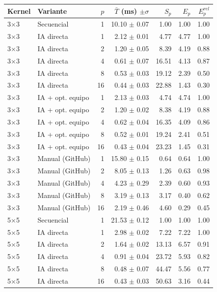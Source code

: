 \begin{tabular}{llrrrrr}
\toprule
Kernel & Variante & $p$ & $\bar{T}$ (ms) $\pm\sigma$ & $S_p$ & $E_p$ & $E^{rel}_p$ \\
\midrule
3$\times$3 & Secuencial & 1 & 10.10 $\pm$ 0.07 & 1.00 & 1.00 & 1.00 \\
3$\times$3 & IA directa & 1 & 2.12 $\pm$ 0.01 & 4.77 & 4.77 & 1.00 \\
3$\times$3 & IA directa & 2 & 1.20 $\pm$ 0.05 & 8.39 & 4.19 & 0.88 \\
3$\times$3 & IA directa & 4 & 0.61 $\pm$ 0.07 & 16.51 & 4.13 & 0.87 \\
3$\times$3 & IA directa & 8 & 0.53 $\pm$ 0.03 & 19.12 & 2.39 & 0.50 \\
3$\times$3 & IA directa & 16 & 0.44 $\pm$ 0.03 & 22.88 & 1.43 & 0.30 \\
3$\times$3 & IA + opt. equipo & 1 & 2.13 $\pm$ 0.03 & 4.74 & 4.74 & 1.00 \\
3$\times$3 & IA + opt. equipo & 2 & 1.20 $\pm$ 0.02 & 8.38 & 4.19 & 0.88 \\
3$\times$3 & IA + opt. equipo & 4 & 0.62 $\pm$ 0.04 & 16.35 & 4.09 & 0.86 \\
3$\times$3 & IA + opt. equipo & 8 & 0.52 $\pm$ 0.01 & 19.24 & 2.41 & 0.51 \\
3$\times$3 & IA + opt. equipo & 16 & 0.43 $\pm$ 0.04 & 23.23 & 1.45 & 0.31 \\
3$\times$3 & Manual (GitHub) & 1 & 15.80 $\pm$ 0.15 & 0.64 & 0.64 & 1.00 \\
3$\times$3 & Manual (GitHub) & 2 & 8.05 $\pm$ 0.13 & 1.26 & 0.63 & 0.98 \\
3$\times$3 & Manual (GitHub) & 4 & 4.23 $\pm$ 0.29 & 2.39 & 0.60 & 0.93 \\
3$\times$3 & Manual (GitHub) & 8 & 3.19 $\pm$ 0.13 & 3.17 & 0.40 & 0.62 \\
3$\times$3 & Manual (GitHub) & 16 & 2.19 $\pm$ 0.46 & 4.60 & 0.29 & 0.45 \\
\midrule
5$\times$5 & Secuencial & 1 & 21.53 $\pm$ 0.12 & 1.00 & 1.00 & 1.00 \\
5$\times$5 & IA directa & 1 & 2.98 $\pm$ 0.02 & 7.22 & 7.22 & 1.00 \\
5$\times$5 & IA directa & 2 & 1.64 $\pm$ 0.02 & 13.13 & 6.57 & 0.91 \\
5$\times$5 & IA directa & 4 & 0.91 $\pm$ 0.04 & 23.72 & 5.93 & 0.82 \\
5$\times$5 & IA directa & 8 & 0.48 $\pm$ 0.07 & 44.47 & 5.56 & 0.77 \\
5$\times$5 & IA directa & 16 & 0.43 $\pm$ 0.03 & 50.63 & 3.16 & 0.44 \\

\end{tabular}

